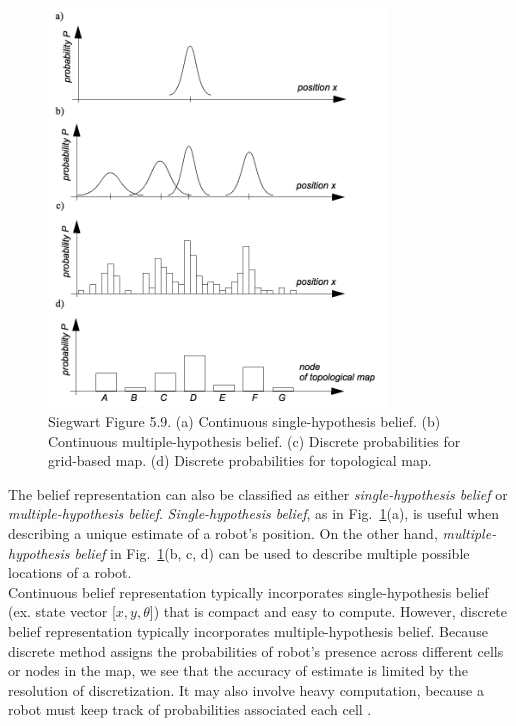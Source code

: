\documentclass[twoside]{article}
\begin{document}
\begin{figure}[h!]
	\centering
    \includegraphics[width=0.8\textwidth]{img/Siegwart_beliefs.png}
    \caption{Siegwart Figure 5.9. (a) Continuous single-hypothesis belief. (b) Continuous multiple-hypothesis belief. (c) Discrete probabilities for grid-based map. (d) Discrete probabilities for topological map.}
    \label{fig:siegwart_beliefs}
\end{figure}

The belief representation can also be classified as either \emph{single-hypothesis belief} or \emph{multiple-hypothesis belief}. \emph{Single-hypothesis belief}, as in Fig.~\ref{fig:siegwart_beliefs}(a), is useful when describing a unique estimate of a robot's position. On the other hand, \emph{multiple-hypothesis belief} in Fig.~\ref{fig:siegwart_beliefs}(b, c, d) can be used to describe multiple possible locations of a robot. \\

Continuous belief representation typically incorporates single-hypothesis belief (ex. state vector [$x, y, \theta$]) that is compact and easy to compute. However, discrete belief representation typically incorporates multiple-hypothesis belief. Because discrete method assigns the probabilities of robot's presence across different cells or nodes in the map, we see that the accuracy of estimate is limited by the resolution of discretization. It may also involve heavy computation, because a robot must keep track of probabilities associated each cell \cite{Clark}.
\end{document}
